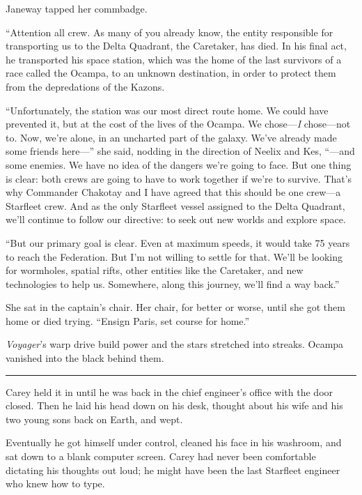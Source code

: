 \documentclass[twoside,letterpaper,12pt]{memoir}
\begin{document}
Janeway tapped her commbadge. 

``Attention all crew. As many of you already know, the entity responsible for transporting us to the Delta Quadrant, the Caretaker, has died. In his final act, he transported his space station, which was the home of the last survivors of a race called the Ocampa, to an unknown destination, in order to protect them from the depredations of the Kazons. 

``Unfortunately, the station was our most direct route home. We could have prevented it, but at the cost of the lives of the Ocampa. We chose---\textit{I }chose---not to. Now, we’re alone, in an uncharted part of the galaxy. We’ve already made some friends here---” she said, nodding in the direction of Neelix and Kes, ``---and some enemies. We have no idea of the dangers we're going to face. But one thing is clear: both crews are going to have to work together if we're to survive. That's why Commander Chakotay and I have agreed that this should be one crew---a Starfleet crew. And as the only Starfleet vessel assigned to the Delta Quadrant, we'll continue to follow our directive: to seek out new worlds and explore space. 

``But our primary goal is clear. Even at maximum speeds, it would take 75 years to reach the Federation. But I'm not willing to settle for that. We'll be looking for wormholes, spatial rifts, other entities like the Caretaker, and new technologies to help us. Somewhere, along this journey, we'll find a way back.” 

She sat in the captain’s chair. Her chair, for better or worse, until she got them home or died trying. ``Ensign Paris, set course for home.” 

\textit{Voyager}’s warp drive build power and the stars stretched into streaks. Ocampa vanished into the black behind them. 

\begin{center}\rule{3cm}{0.4 pt}\end{center} 

Carey held it in until he was back in the chief engineer’s office with the door closed. Then he laid his head down on his desk, thought about his wife and his two young sons back on Earth, and wept. 

Eventually he got himself under control, cleaned his face in his washroom, and sat down to a blank computer screen. Carey had never been comfortable dictating his thoughts out loud; he might have been the last Starfleet engineer who knew how to type. 
\end{document}
